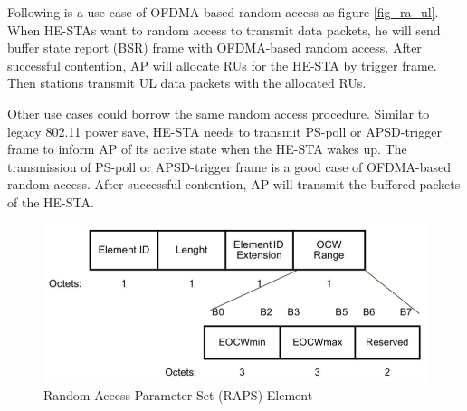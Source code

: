 Following is a use case of OFDMA-based random access as figure \ref{fig_ra_ul}. 
When HE-STAs want to random access to transmit data packets, he will send buffer state report (BSR) frame with OFDMA-based random access. 
After successful contention, AP will allocate RUs for the HE-STA by trigger frame.
Then stations transmit UL data packets with the allocated RUs. 


Other use cases could borrow the same random access procedure. 
Similar to legacy 802.11 power save, HE-STA needs to transmit PS-poll or APSD-trigger frame to inform AP of its active state when the HE-STA wakes up.
The transmission of PS-poll or APSD-trigger frame is a good case of OFDMA-based random access. After successful contention, AP will transmit the buffered packets of the HE-STA.

\begin{figure}[!t]
\centering
\includegraphics[scale=0.4]{./figure/chp2/RAPS.png}
\caption{Random Access Parameter Set (RAPS) Element\cite{draft_ax}}
\label{fig_RAPS}
\end{figure}


